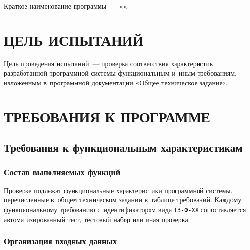 \documentclass[12pt,a4paper]{extarticle}
\begin{document}
Краткое наименование программы~--- «\hseProjectNameShort».

\clearpage

\section{ЦЕЛЬ ИСПЫТАНИЙ}

Цель проведения испытаний~--- проверка соответствия характеристик разработанной программной системы функциональным и~иным требованиям, изложенным в~программной документации «Общее техническое задание».

\clearpage

\section{ТРЕБОВАНИЯ К ПРОГРАММЕ}

\subsection{Требования к функциональным характеристикам}

\subsubsection{Состав выполняемых функций}


Проверке подлежат функциональные характеристики программной системы, перечисленные в~общем техническом задании в~таблице требований. Каждому функциональному требованию с~идентификатором вида \texttt{ТЗ-Ф-XX} сопоставляется автоматизированный тест, тестовый набор или иная проверка.



\clearpage

\subsubsection{Организация входных данных}
\end{document}
